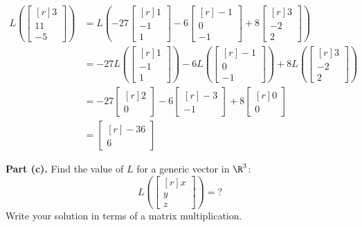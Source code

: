 \documentclass[12pt]{article}
\begin{document}
\begin{align*}
L\left(\begin{bmatrix*}[r]3\\11\\-5\end{bmatrix*}\right)&=L\left(
-27\begin{bmatrix*}[r] 1\\ -1\\ 1\end{bmatrix*}
-6\begin{bmatrix*}[r] -1\\ 0\\-1\end{bmatrix*}+
8\begin{bmatrix*}[r] 3\\ -2\\ 2\end{bmatrix*}\right)\\
&=
-27L\left(\begin{bmatrix*}[r] 1\\ -1\\ 1\end{bmatrix*}\right)
-6L\left(\begin{bmatrix*}[r] -1\\ 0\\-1\end{bmatrix*}\right)+
8L\left(\begin{bmatrix*}[r] 3\\ -2\\ 2\end{bmatrix*}\right)\\
&=-27\begin{bmatrix*}[r] 2\\0 \end{bmatrix*}
-6\begin{bmatrix*}[r] -3\\-1 \end{bmatrix*}
+8\begin{bmatrix*}[r] 0\\0 \end{bmatrix*}\\
&=
\begin{bmatrix*}[r] -36\\6 \end{bmatrix*}
\end{align*}
\proofend

\textbf{Part (c).} Find the value of $L$ for a generic vector in $\R^3$:
\[
L\left(\begin{bmatrix*}[r] x \\ y \\ z\end{bmatrix*}\right)=?
\]
Write your solution in terms of a matrix multiplication.
\end{document}
